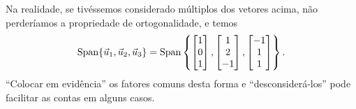 \begin{ex}
Na realidade, se tivéssemos considerado múltiplos dos vetores acima, não perderíamos a propriedade de ortogonalidade, e temos
\begin{equation}
\operatorname{Span} \{ \vec{u}_1, \vec{u}_2, \vec{u}_3 \} =
\operatorname{Span} \left\{
\begin{bmatrix}
1 \\ 0 \\ 1
\end{bmatrix},
\begin{bmatrix}
1 \\ 2 \\ -1
\end{bmatrix},
\begin{bmatrix}
-1 \\ 1 \\ 1
\end{bmatrix}
\right\}.
\end{equation} ``Colocar em evidência'' os fatores comuns desta forma e ``desconsiderá-los'' pode facilitar as contas em alguns casos.


\end{ex}
